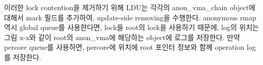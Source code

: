 이러한 lock contention을 제거하기 위해 LDU는 각각의 anon\_vma\_chain object에 대해서
mark 필드를 추가하여, update-side removing을 수행한다.
anonymous rmap역시 global queue를 사용한다면, lock을 root의 lock을 사용하기 때문에, log의 위치는 그림
x-x와 같이 root의 anon\_vma에 해당하는 object에 로그를 저장한다. 
만약 percore queue를 사용하면, percore에 위치에 root 포인터 정보와 함께 operation log를 저장한다.







 

